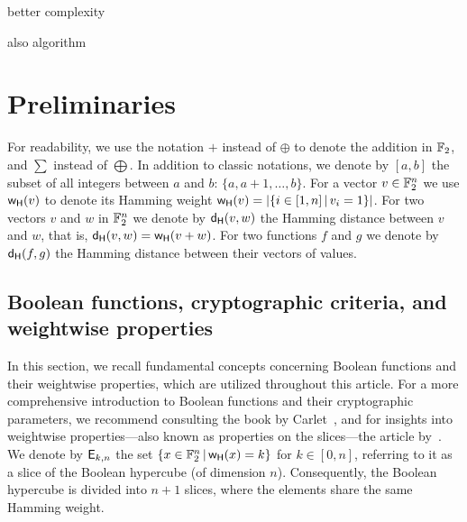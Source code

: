 \documentclass[11pt]{llncs}
\begin{document}
better complexity~\cite{EC:ACGKMR06}

also algorithm~\cite{FSE:DidTil06}




\section{Preliminaries}\label{sec:prelim}


For readability, we use the notation $+$ instead of 
$\oplus$ to denote the addition in $\mathbb{F}_2$, and $\sum$ instead of $\bigoplus$. 
In addition to classic notations, we denote by $ [a,b] $ the subset of all integers between $a$ and $b$: $\{a, a+1, \ldots,b\}$. 
For a vector $v\in \mathbb{F}_2^n$ we use $\mathsf{w_H}(v)$ to denote its Hamming weight $\mathsf{w_H}(v)=|\{ i \in [1,n] \, | \, v_i=1 \}|$. 
For two vectors $v$ and $w$ in $\mathbb{F}_2^n$ we denote by $\mathsf{d_H}(v,w)$ the Hamming distance between $v$ and $w$, that is, $\mathsf{d_H}(v,w)=\mathsf{w_H}(v+w)$. 
For two functions $f$ and $g$ we denote by $\mathsf{d_H}(f,g)$ the Hamming distance between their vectors of values.


\subsection{Boolean functions, cryptographic criteria, and weightwise properties}
In this section, we recall fundamental concepts concerning Boolean functions and their weightwise properties, which are utilized throughout this article. For a more comprehensive introduction to Boolean functions and their cryptographic parameters, we recommend consulting the book by Carlet~\cite{Carlet20},
and for insights into weightwise properties—also known as properties on the slices—the article by~\cite{TOSC:CarMeaRot17}.
We denote by $\mathsf{E}_{k,n}$ the set $\{x\in \mathbb{F}_2^n \, | \, \mathsf{w_H}(x)=k \}$ for $k \in [0,n]$, referring to it as a slice of the Boolean hypercube (of dimension $n$). 
Consequently, the Boolean hypercube is divided into $n+1$ slices, where the elements share the same Hamming weight.
\end{document}
